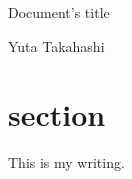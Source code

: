 \documentclass[12pt,oneside, a4paper]{jarticle}
\newcommand{\titlename}{Document's title}
\newcommand{\myname}{Yuta Takahashi}
\newcommand{\makemytitle}{
\vspace*{0truemm}
\begin{center}
  \LARGE\titlename
\end{center}
\begin{flushright}
  \myname
\end{flushright}
}
\begin{document}
\makemytitle
\section{section}
This is my writing.
\end{document}
